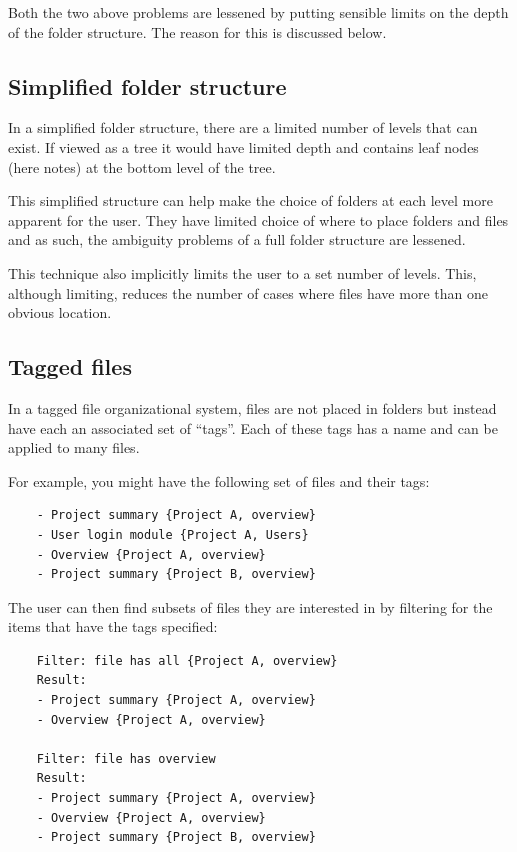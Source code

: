 Both the two above problems are lessened by putting sensible limits on
the depth of the folder structure. The reason for this is discussed
below.

\subsection{Simplified folder structure}\label{simplified-folder-structure}

In a simplified folder structure, there are a limited number of levels that can
exist. If viewed as a tree it would have limited depth and contains leaf nodes
(here notes) at the bottom level of the tree.

This simplified structure can help make the choice of folders at each
level more apparent for the user. They have limited choice of
where to place folders and files and as such, the ambiguity problems of a
full folder structure are lessened.

This technique also implicitly limits the user to a set number of
levels. This, although limiting, reduces the number of cases where files have
 more than one obvious location.

\subsection{Tagged files}\label{tagged-files}

In a tagged file organizational system, files are not placed in folders
but instead have each an associated set of ``tags''. Each of these tags
has a name and can be applied to many files.

For example, you might have the following set of files and their tags:

\begin{verbatim}
    - Project summary {Project A, overview}
    - User login module {Project A, Users}
    - Overview {Project A, overview}
    - Project summary {Project B, overview}
\end{verbatim}

The user can then find subsets of files they are interested in by
filtering for the items that have the tags specified:

\begin{verbatim}
    Filter: file has all {Project A, overview}
    Result:
    - Project summary {Project A, overview}
    - Overview {Project A, overview}

    Filter: file has overview
    Result:
    - Project summary {Project A, overview}
    - Overview {Project A, overview}
    - Project summary {Project B, overview}
\end{verbatim}

